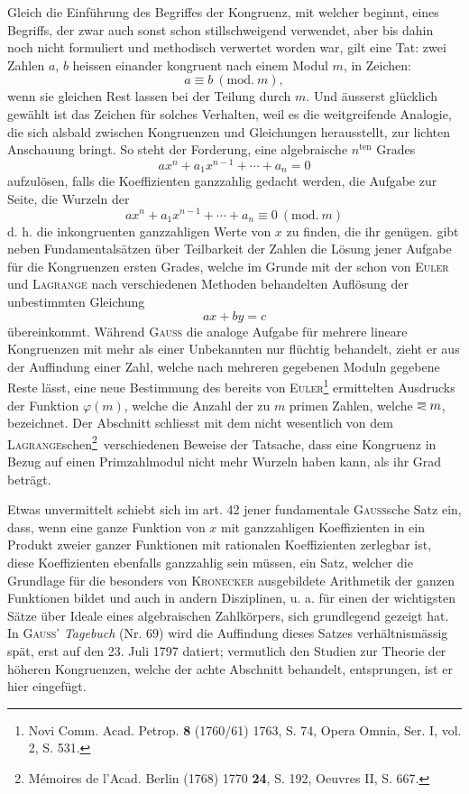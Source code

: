 Gleich die Einführung des Begriffes der Kongruenz, mit welcher  beginnt, eines Begriffs, der zwar auch sonst schon stillschweigend verwendet, aber bis dahin noch nicht formuliert und methodisch verwertet worden war, gilt eine Tat: zwei Zahlen \(a,\,b\) heissen einander kongruent nach einem Modul \(m\), in Zeichen:
\[
a\equiv b\ (\mathrm{mod.}\ m),
\]
wenn sie gleichen Rest lassen bei der Teilung durch \(m\). Und äusserst glücklich gewählt ist das Zeichen für solches Verhalten, weil es die weitgreifende Analogie, die sich alsbald zwischen Kongruenzen und Gleichungen herausstellt,\newpage
{}
\noindent zur lichten Anschauung bringt. So steht der Forderung, eine algebraische  \(n^{\mathrm{ten}}\) Grades
\[
ax^n+a_1x^{n-1}+\cdots+a_n=0
\]
aufzulösen, falls die Koeffizienten ganzzahlig gedacht werden, die Aufgabe zur Seite, die Wurzeln der 
\[
ax^n+a_1x^{n-1}+\cdots+a_n\equiv0\ (\mathrm{mod.}\ m)
\]
d. h. die inkongruenten ganzzahligen Werte von \(x\) zu finden, die ihr genügen.  gibt neben Fundamentalsätzen über Teilbarkeit der Zahlen die Lösung jener Aufgabe für die Kongruenzen ersten Grades, welche im Grunde mit der schon von \textsc{Euler} und \textsc{Lagrange} nach verschiedenen Methoden behandelten Auflösung der unbestimmten Gleichung
\[
ax+by=c
\]
übereinkommt. Während \textsc{Gauss} die analoge Aufgabe für mehrere lineare Kongruenzen mit mehr als einer Unbekannten nur flüchtig behandelt, zieht er aus der Auffindung einer Zahl, welche nach mehreren gegebenen Moduln gegebene Reste lässt, eine neue Bestimmung des bereits von \textsc{Euler}\footnote{Novi Comm. Acad. Petrop. \textbf{8} (1760/61) 1763, S. 74, Opera Omnia, Ser. I, vol. 2, S. 531.} ermittelten Ausdrucks der Funktion \(\varphi(m)\), welche die Anzahl der zu \(m\) primen Zahlen, welche \(\EqualAboveLess m\), bezeichnet. Der Abschnitt schliesst mit dem nicht wesentlich von dem \textsc{Lagrange}schen\begingroup\renewcommand{\thefootnote}{**)}\footnote{Mémoires de l’Acad. Berlin (1768) 1770 \textbf{24}, S. 192, Oeuvres II, S. 667.}\endgroup\ verschiedenen Beweise der Tatsache, dass eine Kongruenz in Bezug auf einen Primzahlmodul nicht mehr Wurzeln haben kann, als ihr Grad beträgt.

Etwas unvermittelt schiebt sich im art. 42 jener fundamentale \textsc{Gauss}sche Satz ein, dass, wenn eine ganze Funktion von \(x\) mit ganzzahligen Koeffizienten in ein Produkt zweier ganzer Funktionen mit rationalen Koeffizienten zerlegbar ist, diese Koeffizienten ebenfalls ganzzahlig sein müssen, ein Satz, welcher die Grundlage für die besonders von \textsc{Kronecker} ausgebildete Arithmetik der ganzen Funktionen bildet und auch in andern Disziplinen, u. a. für einen der wichtigsten Sätze über Ideale eines algebraischen Zahlkörpers, sich grundlegend gezeigt hat. In \textsc{Gauss}’ \textit{Tagebuch} (Nr. 69) wird die Auffindung dieses Satzes
\clearpage{}
\noindent verhältnismässig spät, erst auf den 23. Juli 1797 datiert; vermutlich den Studien zur Theorie der höheren Kongruenzen, welche der achte Abschnitt behandelt, entsprungen, ist er hier eingefügt.
